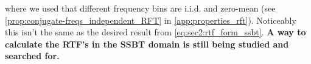 where we used that different frequency bins are i.i.d. and zero-mean (see \cref{prop:conjugate-freqs_independent_RFT} in \cref{app:properties_rft}). Noticeably this isn't the same as the desired result from \cref{eq:sec2:rtf_form_ssbt}. \textbf{A way to calculate the RTF's in the SSBT domain is still being studied and searched for.}
%

